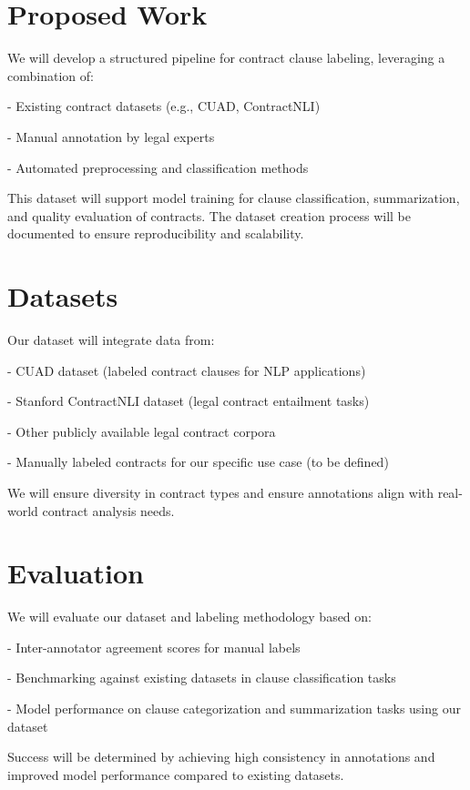 \documentclass[11pt, oneside]{article}   	%
\begin{document}
\section*{Proposed Work}
We will develop a structured pipeline for contract clause labeling, leveraging a combination of:

- Existing contract datasets (e.g., CUAD, ContractNLI)

- Manual annotation by legal experts

- Automated preprocessing and classification methods

This dataset will support model training for clause classification, summarization, and quality evaluation of contracts. The dataset creation process will be documented to ensure reproducibility and scalability.



\section*{Datasets}
Our dataset will integrate data from:

- CUAD dataset (labeled contract clauses for NLP applications)

- Stanford ContractNLI dataset (legal contract entailment tasks)

- Other publicly available legal contract corpora

- Manually labeled contracts for our specific use case (to be defined)

We will ensure diversity in contract types and ensure annotations align with real-world contract analysis needs.

\section*{Evaluation}
We will evaluate our dataset and labeling methodology based on:

- Inter-annotator agreement scores for manual labels

- Benchmarking against existing datasets in clause classification tasks

- Model performance on clause categorization and summarization tasks using our dataset

Success will be determined by achieving high consistency in annotations and improved model performance compared to existing datasets.
\end{document}
